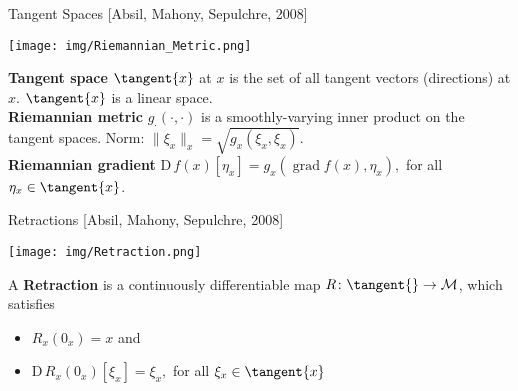 \documentclass{beamer}
\begin{document}
\begin{frame}{Tangent Spaces}
    \vspace{-1\baselineskip}\hfill{\tiny{[Absil, Mahony, Sepulchre, 2008]}}
    \begin{center}
        \texttt{[image: img/Riemannian\_Metric.png]}
    \end{center}
    \textbf{Tangent space} $\tangent{x}$ at $x$ is the set of all tangent vectors (directions) at $x$. $\tangent{x}$ is a linear space. \\[0.2\baselineskip]
    \textbf{Riemannian metric} $g_{\cdot} (\cdot, \cdot)$ is a smoothly-varying inner product on the tangent spaces. Norm: $\lVert \xi_x \rVert_x = \sqrt{g_x(\xi_x, \xi_x)}$. \\[0.2\baselineskip]
    \textbf{Riemannian gradient} $\mathrm{D} \, f(x) [\eta_x] = g_x (\operatorname{grad} f(x), \eta_x),$ for all $\eta_x \in \tangent{x}$.
\end{frame}

\begin{frame}{Retractions}
    \vspace{-1\baselineskip}\hfill{\tiny{[Absil, Mahony, Sepulchre, 2008]}}
    \begin{center}
        \texttt{[image: img/Retraction.png]}
    \end{center}
    A \textbf{Retraction} is a continuously differentiable map $R \colon \tangent{} \to \mathcal{M}$, which satisfies \\[-0.1\baselineskip]
    \begin{itemize}
        \item $R_x (0_x) = x$ and
        \item $\mathrm{D} \, R_x (0_x)[\xi_x] = \xi_x,$ for all $\xi_x \in \tangent{x}$
    \end{itemize}
\end{frame}
\end{document}
